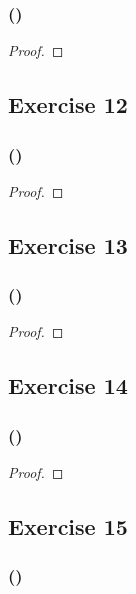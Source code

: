 \documentclass[14pt]{extarticle}
\begin{document}
\subsubsection{()}

\begin{proof}

\end{proof}

\subsection{Exercise 12}

\subsubsection{()}

\begin{proof}

\end{proof}

\subsection{Exercise 13}

\subsubsection{()}

\begin{proof}

\end{proof}

\subsection{Exercise 14}

\subsubsection{()}

\begin{proof}

\end{proof}

\subsection{Exercise 15}

\subsubsection{()}
\end{document}
